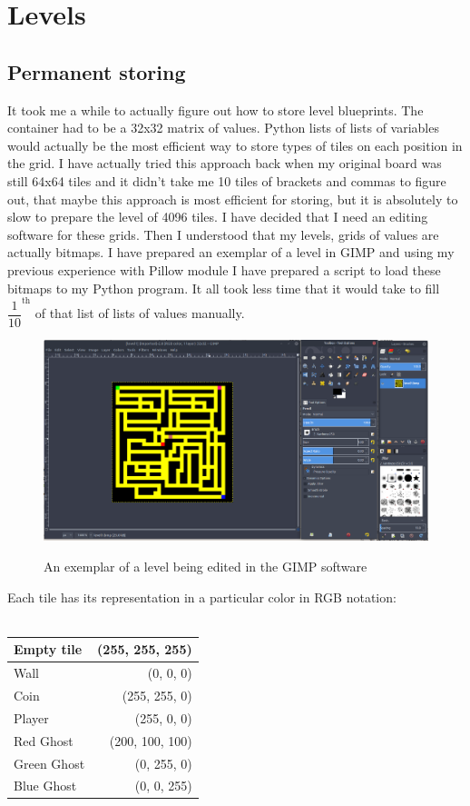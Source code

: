 \documentclass[11pt,a4paper]{report}
\newcommand{\dsubsection}[1]{\FloatBarrier \subsection{#1}}
\newenvironment{img}{
	\begin{center}
		\begin{figure}[H]
			\begin{center}
			
}{
	\end{center}
		\end{figure}
			\end{center}
}
\begin{document}
		\section{Levels}
		\label{Levels}
			\dsubsection{Permanent storing}
				It took me a while to actually figure out how to store level blueprints. The container had to be a 32x32 matrix of values. Python lists of lists of variables would actually be the most efficient way to store types of tiles on each position in the grid. I have actually tried this approach back when my original board was still 64x64 tiles and it didn't take me 10 tiles of brackets and commas to figure out, that maybe this approach is most efficient for storing, but it is absolutely to slow to prepare the level of 4096 tiles. I have decided that I need an editing software for these grids. Then I understood that my levels, grids of values are actually bitmaps. I have prepared an exemplar of a level in GIMP and using my previous experience with Pillow module I have prepared a script to load these bitmaps to my Python program. It all took less time that it would take to fill $\dfrac{1}{10}^{\text{th}}$ of that list of lists of values manually.
				\begin{img}
					\includegraphics[width=350pt]{images/gimp_level_editing}\\
					\caption{An exemplar of a level being edited in the GIMP software}
					\label{gimplevel}
				\end{img}
				Each tile has its representation in a particular color in RGB notation:\\ \\
				\begin{tabular}{| l | r |}
					\hline 
					Empty tile & (255, 255, 255) \\ \hline
					Wall & (0, 0, 0) \\ \hline
					Coin & (255, 255, 0) \\ \hline
					Player & (255, 0, 0) \\ \hline
					Red Ghost & (200, 100, 100) \\ \hline
					Green Ghost & (0, 255, 0) \\ \hline
					Blue Ghost & (0, 0, 255) \\ 
					\hline
				\end{tabular}
\end{document}
